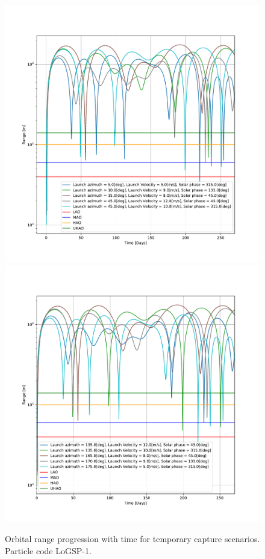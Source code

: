 \FloatBarrier
\begin{figure}[p]
\centering
\captionsetup{justification=centering}
\includegraphics[scale=0.5]{longest_edge_perturbations/3.2Density_1cmSize/altitude_versus_time_all_cases_part_1.pdf}
\includegraphics[scale=0.5]{longest_edge_perturbations/3.2Density_1cmSize/altitude_versus_time_all_cases_part_2.pdf}
\caption{Orbital range progression with time for temporary capture scenarios. Particle code LoGSP-1.}
\label{fig:LoGSP_1_capture_orbital_range}
\end{figure}

